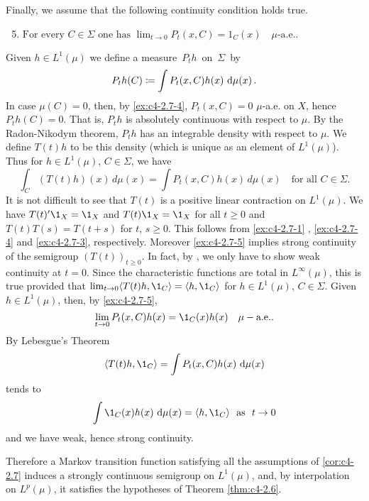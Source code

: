 \begin{example}
Finally, we assume that the following continuity condition holds true.
\begin{enumerate}[\upshape (i)]
\setcounter{enumi}{4}
\item \label{ex:c4-2.7-5}
$\text{For every } C \in \Sigma \text{ one has } \lim_{t \to 0} P_{t}(x,C) = 1_{C}(x) \quad \mu\text{-a.e.} .$
\end{enumerate}
Given $h \in L^{1}(\mu)$ we define a measure\, $P_{t}h$\, on\, $\Sigma$\, by
\[
P_{t}h(C) \coloneqq \int P_{t}(x,C)h(x) \, \mathop{}\!\mathrm{d}{\mu(x)}\,.
\]
In case $\mu(C) = 0$, then, by \ref{ex:c4-2.7-4}, $P_{t}(x,C) = 0$ $\mu$-a.e. on $X$, hence $P_{t}h(C) = 0$.
That is, $P_{t}h$ is absolutely continuous with respect to $\mu$.
By the Radon-Nikodym theorem, $P_{t}h$ has an integrable density with respect to $\mu$.
We define $T(t)h$ to be this density (which is unique as an element of $L^{1}(\mu)$).
Thus for $h \in L^{1}(\mu)$, $C \in \Sigma$, we have
\begin{equation}\label{eq:c4-2.8}
\int_{C}(T(t)h)(x) \, d\mu(x) = \int P_{t}(x,C)h(x) \, d\mu(x) \quad \text{for all } C \in \Sigma.
\end{equation}
It is not difficult to see that $T(t)$ is a positive linear contraction on $L^{1}(\mu)$.
We have $T(t)'\1_{X} = \1_{X}$ and $T(t)\1_{X} = \1_{X}$ for all $t \geq 0$ and $T(t)T(s) = T(t+s)$ for $t$, $s \geq 0$.
This follows from \ref{ex:c4-2.7-1} , \ref{ex:c4-2.7-4} and \ref{ex:c4-2.7-3}, respectively.
Moreover \ref{ex:c4-2.7-5} implies strong continuity of the semigroup $(T(t))_{t \geq 0}$.
In fact, by \citet[Proposition 1.23]{davies:1980}, we only have to show weak continuity at $t = 0$.
Since the characteristic functions are total in $L^{\infty}(\mu)$, this is true provided that $\lim_{t \to 0} \langle T(t)h,\1_{C}\rangle = \langle h,\1_{C}\rangle$ for $h \in L^{1}(\mu)$, $C \in \Sigma$.
Given $h \in L^{1}(\mu)$, then, by \ref{ex:c4-2.7-5}, 
\[
\lim_{t \to 0} P_{t}(x,C)h(x) = \1_{C}(x)h(x)\quad\mu-\text{a.e.}.
\]
By Lebesgue's Theorem 
\[
\langle T(t)h,\1_{C}\rangle = \int P_{t}(x,C)h(x) \, \diff{\mu(x)}
\]
tends to 
\[
\int \1_{C}(x)h(x) \, \diff{\mu(x)} = \langle h,\1_{C}\rangle \ \text{ as } \ t \to 0
\]
and we have weak, hence strong continuity.

Therefore a Markov transition function satisfying all the assumptions of \ref{cor:c4-2.7} induces a strongly continuous semigroup on $L^{1}(\mu)$, and, by interpolation on $L^{p}(\mu)$, it satisfies the hypotheses of Theorem \ref{thm:c4-2.6}.
\end{example}

